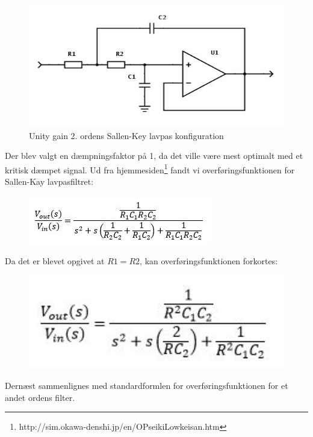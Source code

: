 \begin{figure}[h]
	\centering
	\includegraphics[width=1\textwidth]{Figurer/FilterDesign}
	\caption{Unity gain 2. ordens Sallen-Key lavpas konfiguration}
	\label{fig:Filter}
\end{figure}

Der blev valgt en dæmpningsfaktor på 1, da det ville være mest optimalt med et kritisk dæmpet signal. Ud fra hjemmesiden\footnote{http://sim.okawa-denshi.jp/en/OPseikiLowkeisan.htm} fandt vi overføringsfunktionen for Sallen-Kay lavpasfiltret:

\begin{figure}[h]
	\centering
	\includegraphics{Figurer/ligning1}
	\label{fig:lign1}
\end{figure}

Da det er blevet opgivet at $R1=R2$, kan overføringsfunktionen forkortes: 

\begin{figure}[h]
	\centering
	\includegraphics[width=1\textwidth]{Figurer/ligning2}
	\label{fig:lign2}
\end{figure}

Dernæst sammenlignes med standardformlen for overføringsfunktionen for et andet ordens filter.

